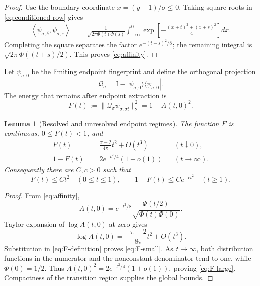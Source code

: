 \documentclass[11pt]{article}
\newtheorem{lemma}[theorem]{Lemma}
\theoremstyle{definition}
\theoremstyle{remark}
\newcommand{\cQ}{\mathcal Q}
\newcommand{\Id}{\mathrm I}
\begin{document}
\begin{proof}
Use the boundary coordinate $x=(y-1)/\sigma\le0$.  Taking square roots in
\eqref{eq:conditioned-row} gives
\begin{align*}
 \left\langle\psi_{\sigma,\delta},
 \psi_{\sigma,\varepsilon}\right\rangle
 &=\frac1{\sqrt{2\pi\Phi(t)\Phi(s)}}
 \int_{-\infty}^0
 \exp\left[-\frac{(x+t)^2+(x+s)^2}{4}\right]dx.
\end{align*}
Completing the square separates the factor $e^{-(t-s)^2/8}$; the remaining
integral is $\sqrt{2\pi}\Phi((t+s)/2)$.  This proves
\eqref{eq:affinity}.
\end{proof}

Let $\psi_{\sigma,0}$ be the limiting endpoint fingerprint and define the
orthogonal projection
\begin{equation}\label{eq:endpoint-projection}
 \cQ_\sigma
 =\Id-|\psi_{\sigma,0}\rangle\langle\psi_{\sigma,0}|.
\end{equation}
The energy that remains after endpoint extraction is
\begin{equation}\label{eq:F-definition}
 F(t)
 :=\|\cQ_\sigma\psi_{\sigma,\sigma t}\|_2^2
 =1-A(t,0)^2.
\end{equation}

\begin{lemma}[Resolved and unresolved endpoint regimes]
\label{lem:F-bounds}
The function $F$ is continuous, $0\le F(t)<1$, and
\begin{align}
 F(t)
 &=\frac{\pi-2}{4\pi}t^2+O(t^3)
 &&(t\downarrow0),
 \label{eq:F-small}\\
 1-F(t)
 &=2e^{-t^2/4}(1+o(1))
 &&(t\to\infty).
 \label{eq:F-large}
\end{align}
Consequently there are $C,c>0$ such that
\begin{equation}\label{eq:F-global-bounds}
 F(t)\le Ct^2\quad(0\le t\le1),
 \qquad
 1-F(t)\le Ce^{-ct^2}\quad(t\ge1).
\end{equation}
\end{lemma}

\begin{proof}
From \eqref{eq:affinity},
\begin{equation}\label{eq:endpoint-overlap}
 A(t,0)=e^{-t^2/8}
 \frac{\Phi(t/2)}{\sqrt{\Phi(t)\Phi(0)}}.
\end{equation}
Taylor expansion of $\log A(t,0)$ at zero gives
\[
 \log A(t,0)
 =-\frac{\pi-2}{8\pi}t^2+O(t^3).
\]
Substitution in \eqref{eq:F-definition} proves \eqref{eq:F-small}.  As
$t\to\infty$, both distribution functions in the numerator and the
nonconstant denominator tend to one, while $\Phi(0)=1/2$.  Thus
$A(t,0)^2=2e^{-t^2/4}(1+o(1))$, proving \eqref{eq:F-large}.  Compactness of
the transition region supplies the global bounds.
\end{proof}
\end{document}
